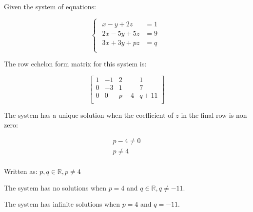 \documentclass[a4paper,11pt]{article}
\begin{document}
Given the system of equations:

$$
\begin{cases}
\begin{aligned}
x - y + 2z & = 1 \\
2x - 5y + 5z & = 9 \\
3x + 3y + pz & = q \\
\end{aligned}
\end{cases}
$$

The row echelon form matrix for this system is:

$$
\begin{bmatrix}
1 & -1 & 2 & 1 \\
0 & -3 & 1 & 7 \\
0 & 0 & p - 4 & q + 11 \\
\end{bmatrix}
$$

The system has a unique solution when the coefficient of $z$ in the final row
is non-zero:

$$
\begin{aligned}
p - 4 \neq 0 \\
p \neq 4 \\
\end{aligned}
$$

Written as: $p, q \in \mathbb{R}, p \neq 4$

The system has no solutions when $p = 4$ and $q \in \mathbb{R}, q \neq -11$.

The system has infinite solutions when $p = 4$ and $q = -11$.
\end{document}
